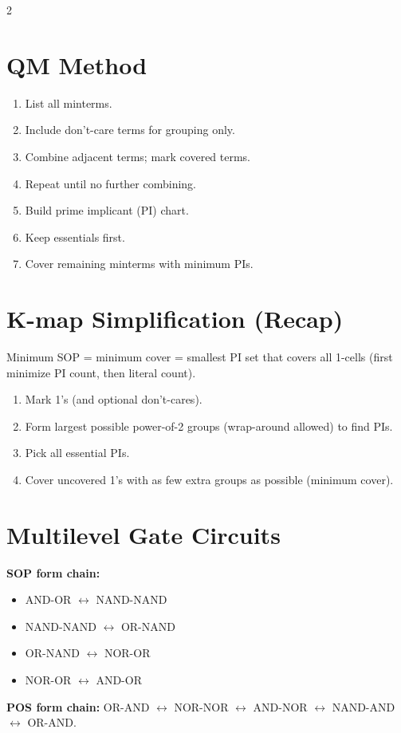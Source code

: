 \documentclass[10pt]{article}
\begin{document}
{\begin{multicols}{2}
\section*{QM Method}
\begin{enumerate}
    \item List all minterms.
    \item Include don't-care terms for grouping only.
    \item Combine adjacent terms; mark covered terms.
    \item Repeat until no further combining.
    \item Build prime implicant (PI) chart.
    \item Keep essentials first.
    \item Cover remaining minterms with minimum PIs.
\end{enumerate}

\section*{K-map Simplification (Recap)}
Minimum SOP = minimum cover = smallest PI set that covers all 1-cells
(first minimize PI count, then literal count).
\begin{enumerate}
    \item Mark 1's (and optional don't-cares).
    \item Form largest possible power-of-2 groups (wrap-around allowed) to find PIs.
    \item Pick all essential PIs.
    \item Cover uncovered 1's with as few extra groups as possible (minimum cover).
\end{enumerate}

\section*{Multilevel Gate Circuits}
\textbf{SOP form chain:}
\begin{itemize}
    \item AND-OR $\leftrightarrow$ NAND-NAND
    \item NAND-NAND $\leftrightarrow$ OR-NAND
    \item OR-NAND $\leftrightarrow$ NOR-OR
    \item NOR-OR $\leftrightarrow$ AND-OR
\end{itemize}

\textbf{POS form chain:}
OR-AND $\leftrightarrow$ NOR-NOR $\leftrightarrow$ AND-NOR $\leftrightarrow$ NAND-AND $\leftrightarrow$ OR-AND.


\end{multicols}}
\end{document}
